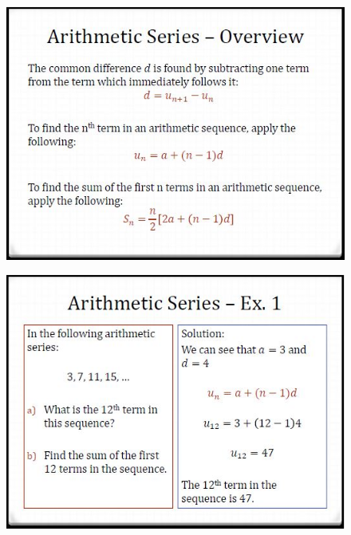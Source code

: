\documentclass{beamer}
\begin{document}
\begin{frame}
	\begin{figure}
		\centering
		\includegraphics[width=0.99\linewidth]{SeqSer17C}
	\end{figure}
	
\end{frame}	
\begin{frame}
	\begin{figure}
		\centering
		\includegraphics[width=0.99\linewidth]{SeqSer17D}
	\end{figure}
	
\end{frame}
\end{document}

